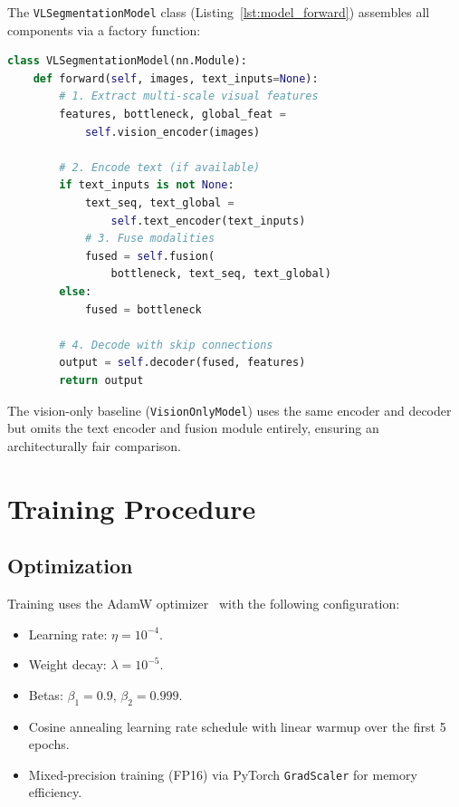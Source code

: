 The \texttt{VLSegmentationModel} class (Listing~\ref{lst:model_forward}) assembles all components via a factory function:

\begin{lstlisting}[language=Python, caption={Simplified forward pass of VLSegmentationModel.}, label={lst:model_forward}]
class VLSegmentationModel(nn.Module):
    def forward(self, images, text_inputs=None):
        # 1. Extract multi-scale visual features
        features, bottleneck, global_feat = 
            self.vision_encoder(images)
        
        # 2. Encode text (if available)
        if text_inputs is not None:
            text_seq, text_global = 
                self.text_encoder(text_inputs)
            # 3. Fuse modalities
            fused = self.fusion(
                bottleneck, text_seq, text_global)
        else:
            fused = bottleneck
        
        # 4. Decode with skip connections
        output = self.decoder(fused, features)
        return output
\end{lstlisting}

The vision-only baseline (\texttt{VisionOnlyModel}) uses the same encoder and decoder but omits the text encoder and fusion module entirely, ensuring an architecturally fair comparison.


\section{Training Procedure}
\label{sec:impl:training}

\subsection{Optimization}
\label{sec:impl:optimization}

Training uses the AdamW optimizer~\cite{loshchilov2019adamw} with the following configuration:

\begin{itemize}
	\item Learning rate: $\eta = 10^{-4}$.
	\item Weight decay: $\lambda = 10^{-5}$.
	\item Betas: $\beta_1 = 0.9$, $\beta_2 = 0.999$.
	\item Cosine annealing learning rate schedule with linear warmup over the first 5 epochs.
	\item Mixed-precision training (FP16) via PyTorch \texttt{GradScaler} for memory efficiency.
\end{itemize}

